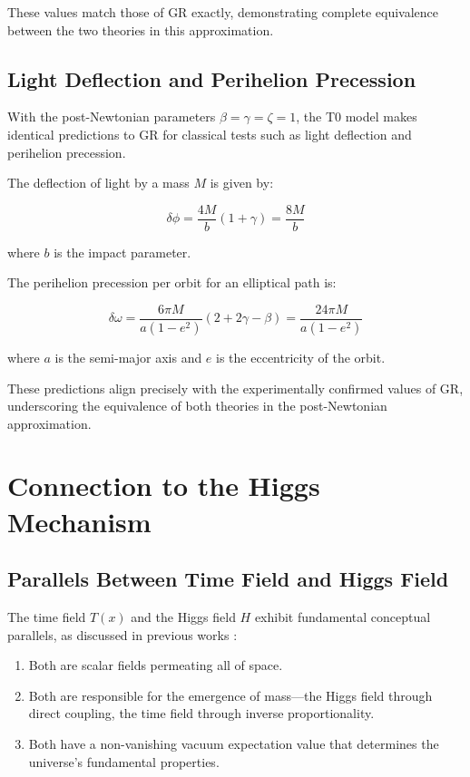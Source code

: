 \documentclass[12pt,a4paper]{article}
\newcommand{\Tfield}{T(x)}
\begin{document}
	These values match those of GR exactly, demonstrating complete equivalence between the two theories in this approximation.
	
	\subsection{Light Deflection and Perihelion Precession}
	With the post-Newtonian parameters \(\beta = \gamma = \zeta = 1\), the T0 model makes identical predictions to GR for classical tests such as light deflection and perihelion precession.
	
	The deflection of light by a mass \(M\) is given by:
	
	\begin{equation}
		\delta\phi = \frac{4M}{b}(1 + \gamma) = \frac{8M}{b}
	\end{equation}
	
	where \(b\) is the impact parameter.
	
	The perihelion precession per orbit for an elliptical path is:
	
	\begin{equation}
		\delta\omega = \frac{6\pi M}{a(1-e^2)}(2 + 2\gamma - \beta) = \frac{24\pi M}{a(1-e^2)}
	\end{equation}
	
	where \(a\) is the semi-major axis and \(e\) is the eccentricity of the orbit.
	
	These predictions align precisely with the experimentally confirmed values of GR, underscoring the equivalence of both theories in the post-Newtonian approximation.
	
	\section{Connection to the Higgs Mechanism}
	
	\subsection{Parallels Between Time Field and Higgs Field}
	The time field \(\Tfield\) and the Higgs field \(H\) exhibit fundamental conceptual parallels, as discussed in previous works \cite{pascher_alpha_2025, pascher_alphabeta_2025}:
	
	\begin{enumerate}
		\item Both are scalar fields permeating all of space.
		\item Both are responsible for the emergence of mass—the Higgs field through direct coupling, the time field through inverse proportionality.
		\item Both have a non-vanishing vacuum expectation value that determines the universe’s fundamental properties.
	\end{enumerate}
	
\end{document}
